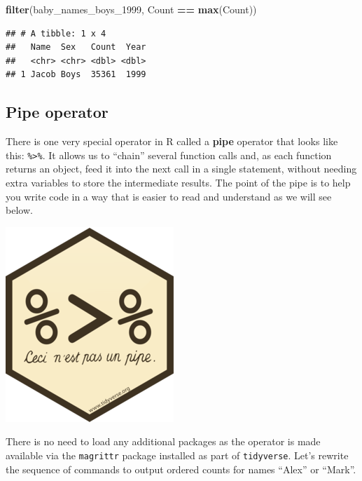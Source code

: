 \documentclass[
]{book}
\newenvironment{Shaded}{\begin{snugshade}}{\end{snugshade}}
\newcommand{\DecValTok}[1]{\textcolor[rgb]{0.00,0.00,0.81}{#1}}
\newcommand{\KeywordTok}[1]{\textcolor[rgb]{0.13,0.29,0.53}{\textbf{#1}}}
\newcommand{\NormalTok}[1]{#1}
\newcommand{\OperatorTok}[1]{\textcolor[rgb]{0.81,0.36,0.00}{\textbf{#1}}}
\newcommand{\StringTok}[1]{\textcolor[rgb]{0.31,0.60,0.02}{#1}}
\begin{document}
\begin{alert}
\begin{enumerate}
\begin{Shaded}
\begin{Highlighting}[]
\KeywordTok{filter}\NormalTok{(baby\_names\_boys\_}\DecValTok{1999}\NormalTok{, Count }\OperatorTok{==}\StringTok{ }\KeywordTok{max}\NormalTok{(Count))}
\end{Highlighting}
\end{Shaded}

\begin{verbatim}
## # A tibble: 1 x 4
##   Name  Sex   Count  Year
##   <chr> <chr> <dbl> <dbl>
## 1 Jacob Boys  35361  1999
\end{verbatim}
\end{enumerate}

\end{alert}

\hypertarget{pipe-operator}{%
\subsection{Pipe operator}\label{pipe-operator}}

There is one very special operator in R called a \textbf{pipe} operator that looks like this: \texttt{\%\textgreater{}\%}. It allows us to ``chain'' several function calls and, as each function returns an object, feed it into the next call in a single statement, without needing extra variables to store the intermediate results. The point of the pipe is to help you write code in a way that is easier to read and understand as we will see below.

\includegraphics{R/Rintro/images/magrittr.png}

There is no need to load any additional packages as the operator is made available via the \texttt{magrittr} package installed as part of \texttt{tidyverse}. Let's rewrite the sequence of commands to output ordered counts for names ``Alex'' or ``Mark''.
\end{document}
